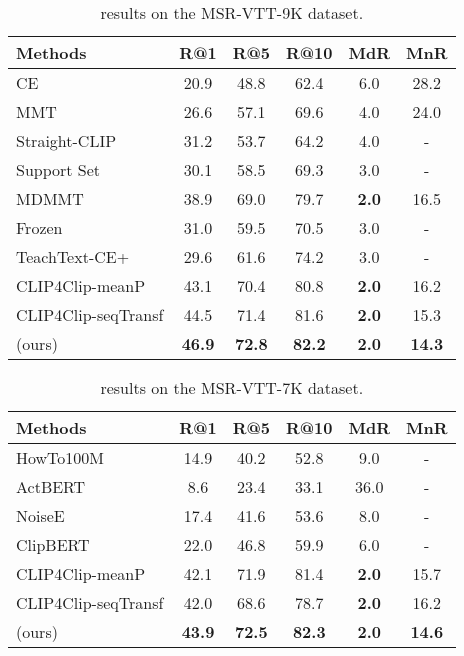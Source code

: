 \documentclass[10pt,twocolumn,letterpaper]{article}
\begin{document}
\begin{table}[b]
\setlength{\tabcolsep}{2pt}
\centering
\footnotesize
\begin{tabular}{l c c c c c} 
\hline 
Methods & R@1  & R@5  & R@10  & MdR  & MnR  \\
\hline
CE \cite{liu2019use} & 20.9 & 48.8 & 62.4 & 6.0 & 28.2 \\
MMT \cite{gabeur2020multi} & 26.6 & 57.1 & 69.6 & 4.0 & 24.0 \\
Straight-CLIP \cite{portillo2021straightforward} & 31.2 & 53.7 & 64.2 & 4.0 & - \\
Support Set \cite{patrick2020support} & 30.1 & 58.5 & 69.3 & 3.0 & - \\
MDMMT \cite{dzabraev2021mdmmt} & 38.9 & 69.0 & 79.7 & \textbf{2.0} & 16.5 \\
Frozen \cite{bain2021frozen} & 31.0 & 59.5 & 70.5 & 3.0 & - \\
TeachText-CE+ \cite{croitoru2021teachtext} & 29.6 & 61.6 & 74.2 & 3.0 & - \\ 
CLIP4Clip-meanP \cite{luo2021clip4clip} & 43.1 & 70.4 & 80.8 & \textbf{2.0} & 16.2 \\
CLIP4Clip-seqTransf \cite{luo2021clip4clip} & 44.5 & 71.4 & 81.6 & \textbf{2.0} & 15.3 \\

\ModelName{} (ours) & \textbf{46.9} & \textbf{72.8} & \textbf{82.2} & \textbf{2.0} & \textbf{14.3} \\
\hline
\end{tabular}
\vspace{-0.2cm}
\caption{ results on the MSR-VTT-9K dataset.}
\label{tab:msrvtt-9k-res}
\end{table}

\begin{table}[b]
\setlength{\tabcolsep}{2pt}
\centering
\footnotesize
\begin{tabular}{l c c c c c} 
\hline 
Methods & R@1  & R@5  & R@10  & MdR  & MnR  \\
\hline
HowTo100M \cite{miech2019howto100m} & 14.9 & 40.2 & 52.8 & 9.0 & - \\
ActBERT \cite{zhu2020actbert} & 8.6 & 23.4 & 33.1 & 36.0 & - \\
NoiseE \cite{amrani2020noise} & 17.4 & 41.6 & 53.6 & 8.0 & - \\
ClipBERT \cite{lei2021less} & 22.0 & 46.8 & 59.9 & 6.0 & - \\
CLIP4Clip-meanP \cite{luo2021clip4clip} & 42.1 & 71.9 & 81.4 & \textbf{2.0} & 15.7 \\
CLIP4Clip-seqTransf \cite{luo2021clip4clip} & 42.0 & 68.6 & 78.7 & \textbf{2.0} & 16.2 \\

\ModelName{} (ours) & \textbf{43.9} & \textbf{72.5} & \textbf{82.3} & \textbf{2.0} & \textbf{14.6} \\

\hline
\end{tabular}
\vspace{-0.2cm}
\caption{ results on the MSR-VTT-7K dataset.}
\label{tab:msrvtt-7k-res}
\end{table}
\end{document}
